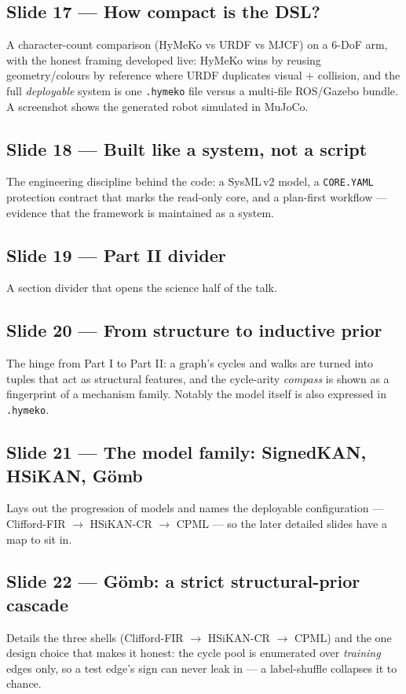 \documentclass[10pt]{article}
\begin{document}
\subsection*{Slide 17 --- How compact is the DSL?}
A character-count comparison (HyMeKo vs URDF vs MJCF) on a 6-DoF arm, with the honest framing developed live: HyMeKo wins by reusing geometry/colours by reference where URDF duplicates visual + collision, and the full \emph{deployable} system is one \texttt{.hymeko} file versus a multi-file ROS/Gazebo bundle. A screenshot shows the generated robot simulated in MuJoCo.

\subsection*{Slide 18 --- Built like a system, not a script}
The engineering discipline behind the code: a SysML\,v2 model, a \texttt{CORE.YAML} protection contract that marks the read-only core, and a plan-first workflow --- evidence that the framework is maintained as a system.

\subsection*{Slide 19 --- Part II divider}
A section divider that opens the science half of the talk.

\subsection*{Slide 20 --- From structure to inductive prior}
The hinge from Part I to Part II: a graph's cycles and walks are turned into tuples that act as structural features, and the cycle-arity \emph{compass} is shown as a fingerprint of a mechanism family. Notably the model itself is also expressed in \texttt{.hymeko}.

\subsection*{Slide 21 --- The model family: SignedKAN, HSiKAN, G\"omb}
Lays out the progression of models and names the deployable configuration --- Clifford-FIR $\to$ HSiKAN-CR $\to$ CPML --- so the later detailed slides have a map to sit in.

\subsection*{Slide 22 --- G\"omb: a strict structural-prior cascade}
Details the three shells (Clifford-FIR $\to$ HSiKAN-CR $\to$ CPML) and the one design choice that makes it honest: the cycle pool is enumerated over \emph{training} edges only, so a test edge's sign can never leak in --- a label-shuffle collapses it to chance.
\end{document}
